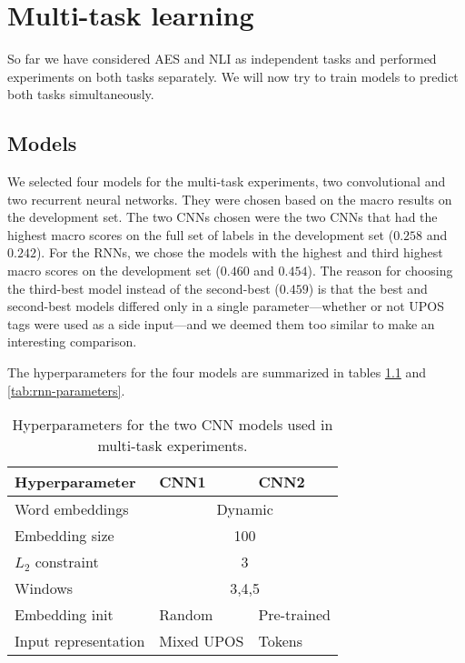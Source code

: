 \chapter{Multi-task learning}

So far we have considered \ac{AES} and \ac{NLI} as independent tasks and
performed experiments on both tasks separately. We will now try to train
models to predict both tasks simultaneously.


\section{Models}

We selected four models for the multi-task experiments, two convolutional and
two recurrent neural networks. They were chosen based on the macro \FI
results on the development set. The two \acp{CNN} chosen were the two
\acp{CNN} that had the highest macro \FI scores on the full set of labels in
the development set ($0.258$ and $0.242$). For the \acp{RNN}, we chose the
models with the highest and third highest macro \FI scores on the development
set ($0.460$ and $0.454$). The reason for choosing the third-best model
instead of the second-best ($0.459$) is that the best and second-best models
differed only in a single parameter---whether or not UPOS tags were used as a
side input---and we deemed them too similar to make an interesting
comparison.

The hyperparameters for the four models are
summarized in tables \ref{tab:cnn-parameters} and \ref{tab:rnn-parameters}.

\begin{table}
  \centering
  \begin{tabular}{lll}
    \toprule
    Hyperparameter       & CNN1 & CNN2 \\
    \midrule
    Word embeddings      & \multicolumn{2}{c}{Dynamic} \\
    Embedding size       & \multicolumn{2}{c}{100} \\
    $L_2$ constraint     & \multicolumn{2}{c}{3} \\
    Windows              & \multicolumn{2}{c}{3,4,5} \\
    Embedding init       & Random & Pre-trained \\
    Input representation & Mixed UPOS & Tokens \\
    \bottomrule
  \end{tabular}
  \caption[Descriptions of the two CNN models]{
    Hyperparameters for the two CNN models used in multi-task experiments.
  }
  \label{tab:cnn-parameters}
\end{table}


